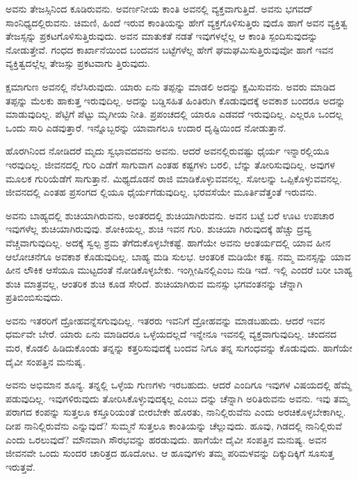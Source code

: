 ಅವನು ತೇಜಸ್ಸಿನಿಂದ ಕೂಡಿರುವನು. ಅವರ್ಣನೀಯ ಕಾಂತಿ ಅವನಲ್ಲಿ ವ್ಯಕ್ತವಾಗುತ್ತಿದೆ. ಅವನು ಭಗವದ್​ಸಾಂನಿಧ್ಯದಲ್ಲಿರುವನು. ಚಿಮಣಿ, ಹಿಂದೆ ಇರುವ ಕಾಂತಿಯನ್ನು ಹೇಗೆ ವ್ಯಕ್ತಗೊಳಿಸುತ್ತಿರು ವುದೊ ಹಾಗೆ ಅವನ ವ್ಯಕ್ತಿತ್ವ ತೇಜಸ್ಸನ್ನು ಪ್ರಕಟಗೊಳಿಸುತ್ತಿರುವುದು. ಅವನ ಮಾತುಕತೆ ನಡತೆ ಇವುಗಳಲ್ಲೆಲ್ಲ ಆ ಕಾಂತಿ ಸ್ಪಂದಿಸುವುದನ್ನು ನೋಡುತ್ತೇವೆ. ಗಂಧದ ಕಾರ್ಖಾನೆಯಿಂದ ಬಂದವನ ಬಟ್ಟೆಗಳೆಲ್ಲ ಹೇಗೆ ಘಮಘಮಿಸುತ್ತಿರುವುವೋ ಹಾಗೆ ಇವನ ವ್ಯಕ್ತಿತ್ವದಲ್ಲೆಲ್ಲ ತೇಜಸ್ಸು ಪ್ರಕಟವಾಗು ತ್ತಿರುವುದು.

ಕ್ಷಮಾಗುಣ ಅವನಲ್ಲಿ ನೆಲೆಸಿರುವುದು. ಯಾರು ಏನು ತಪ್ಪನ್ನು ಮಾಡಲಿ ಅದನ್ನು ಕ್ಷಮಿಸುವನು. ಅವರು ಮಾಡಿದ ತಪ್ಪನ್ನು ಮೆಲಕು ಹಾಕುತ್ತ ಇರುವುದಿಲ್ಲ. ಅದನ್ನು ಬಡ್ಡಿಸಹಿತ ಹಿಂತಿರುಗಿ ಕೊಡುವುದಕ್ಕೆ ಅವಕಾಶ ಬಂದರೂ ಅದನ್ನು ಮಾಡುವುದಿಲ್ಲ. ಪೆಟ್ಟಿಗೆ ಪೆಟ್ಟು ಮೃಗೀಯ ನೀತಿ. ಪ್ರಪಂಚದಲ್ಲಿ ಯಾರೂ ಎಡವದೆ ಇರುವುದಿಲ್ಲ. ಎಲ್ಲರೂ ಒಂದಲ್ಲ ಒಂದು ಸಾರಿ ಎಡವುತ್ತಾರೆ. ಇನ್ನೊಬ್ಬರನ್ನು ಯಾವಾಗಲೂ ಉದಾರ ದೃಷ್ಟಿಯಿಂದ ನೋಡುತ್ತಾನೆ.

ಹೊರಗಿನಿಂದ ನೋಡಿದರೆ ಮೃದು ಸ್ವಭಾವದವನು ಅವನು. ಆದರೆ ಅವನಲ್ಲಿರುವಷ್ಟು ಧೈರ್ಯ ಇನ್ನಾರಲ್ಲಿಯೂ ಇರವುದಿಲ್ಲ. ಜೀವನದಲ್ಲಿ ಗುರಿ ಎಡೆಗೆ ಸಾಗುವಾಗ ಎಂತಹ ಕಷ್ಟಗಳು ಬರಲಿ, ಬೆನ್ನು ತೋರಿಸುವುದಿಲ್ಲ. ಅವುಗಳ ಮೂಲಕ ಗುರಿಯೆಡೆಗೆ ಸಾಗುತ್ತಾನೆ. ಮಿಥ್ಯದೊಡನೆ ರಾಜಿ ಮಾಡಿಕೊಳ್ಳುವವನಲ್ಲ. ಸೋಲನ್ನು ಒಪ್ಪಿಕೊಳ್ಳುವವನಲ್ಲ. ಜೀವನದಲ್ಲಿ ಎಂತಹ ಪ್ರಸಂಗದ ಲ್ಲಿಯೂ ಧೈರ್ಯಗೆಡುವುದಿಲ್ಲ. ಭರವಸೆಯೇ ಮೂರ್ತಿವೆತ್ತಂತೆ ಇರುವನು.

ಅವನು ಬಾಹ್ಯದಲ್ಲಿ ಶುಚಿಯಾಗಿರುವನು, ಅಂತರದಲ್ಲಿ ಶುಚಿಯಾಗಿರುವನು. ಅವನ ಬಟ್ಟೆ ಬರೆ ಊಟ ಉಪಚಾರ ಇವುಗಳೆಲ್ಲ ಶುಚಿಯಾಗಿರುವುವು. ಶೋಕಿಯಲ್ಲ, ಶುಚಿ ಇವನ ಗುರಿ. ಶುಚಿಯಾ ಗಿರುವುದಕ್ಕೆ ಹೆಚ್ಚು ದ್ರವ್ಯ ವೆಚ್ಚವಾಗುವುದಿಲ್ಲ. ಅದಕ್ಕೆ ಸ್ವಲ್ಪ ಶ್ರಮ ತೆಗೆದುಕೊಳ್ಳಬೇಕಷ್ಟೆ. ಹಾಗೆಯೇ ಅವನು ಆಂತರ್ಯದಲ್ಲಿ ಯಾವ ಹೀನ ಆಲೋಚನೆಗೂ ಅವಕಾಶ ಕೊಡುವುದಿಲ್ಲ. ಬಾಹ್ಯ ಮಡಿ ಸುಲಭ. ಆಂತರಿಕ ಮಡಿಯೇ ಕಷ್ಟ. ನಮ್ಮ ಮನಸ್ಸನ್ನು ಯಾವ ಹೀನ ಲೌಕಿಕ ಆಸೆಯೂ ಮುಟ್ಟದಂತೆ ನೋಡಿಕೊಳ್ಳಬೇಕು. ಇಂಗ್ಲೀಷಿನಲ್ಲಿಎಂಬ ನುಡಿ ಇದೆ. ಇಲ್ಲಿ ಎಂದರೆ ಬರೀ ಬಾಹ್ಯ ಶುಚಿ ಮಾತ್ರವಲ್ಲ, ಆಂತರಿಕ ಶುಚಿ ಕೂಡ ಸೇರಿದೆ. ಶುಚಿಯಾಗಿರುವ ಮನಸ್ಸು ಭಗವಂತನನ್ನು ಚೆನ್ನಾಗಿ ಪ್ರತಿಬಿಂಬಿಸುವುದು.

ಅವನು ಇತರರಿಗೆ ದ್ರೋಹವನ್ನೆಸಗುವುದಿಲ್ಲ. ಇತರರು ಇವನಿಗೆ ದ್ರೋಹವನ್ನು ಮಾಡಬಹುದು. ಆದರೆ ಇವನ ಧರ್ಮವೇ ಬೇರೆ. ಯಾರು ಏನು ಮಾಡಿದರೂ ಒಳ್ಳೆಯದಲ್ಲದೆ ಇನ್ನೇನೂ ಇವನಲ್ಲಿ ವ್ಯಕ್ತವಾಗುವುದಿಲ್ಲ. ಚಂದನದ ಮರ, ಕೊಡಲಿ ಹಿಡಿದುಕೊಂಡು ತನ್ನನ್ನು ಕತ್ತರಿಸುವುದಕ್ಕೆ ಬಂದವ ನಿಗೂ ತನ್ನ ಸುಗಂಧವನ್ನು ಕೊಡುವುದು. ಹಾಗೆಯೇ ದೈವೀ ಸಂಪತ್ತಿನ ಮನುಷೃ.

ಅವನು ಅಭಿಮಾನ ಶೂನ್ಯ. ತನ್ನಲ್ಲಿ ಒಳ್ಳೆಯ ಗುಣಗಳು ಇರಬಹುದು. ಆದರೆ ಎಂದಿಗೂ ಇವುಗಳ ವಿಷಯದಲ್ಲಿ ಹೆಮ್ಮೆ ಪಡುವುದಿಲ್ಲ. ಇವುಗಳಿರುವುದು ತೋರಿಸಿಕೊಳ್ಳುವುದಕ್ಕಲ್ಲ ಎಂಬು ದನ್ನು ಚೆನ್ನಾಗಿ ಅರಿತಿರುವನು ಅವನು. ಇವು ತಮ್ಮ ಪರಾಗದ ಕಂಪನ್ನು ಸುತ್ತಲೂ ಕಸ್ತೂರಿಯಂತೆ ಬೀರಬೇಕೇ ಹೊರತು, ನಾನಿಲ್ಲಿರುವೆನು ಎಂದು ಅರಚಿಕೊಳ್ಳಬೇಕಾಗಿಲ್ಲ. ದೀಪ ನಾನಿಲ್ಲಿರುವೆನು ಎನ್ನುವುದೆ? ಸುಮ್ಮನೆ ಸುತ್ತಲೂ ಕಾಂತಿಯನ್ನು ಚೆಲ್ಲುವುದು. ಹೂವು, ಗಿಡದಲ್ಲಿ ನಾನಿಲ್ಲಿರುವೆ ಎಂದು ಒರಲುವುದೆ? ಮೌನವಾಗಿ ಸೌರಭವನ್ನು ಹರಡುವುದು. ಹಾಗೆಯೇ ದೈವೀ ಸಂಪತ್ತಿನ ಮನುಷ್ಯ. ಅವನ ಜೀವನವೇ ಒಂದು ಸುಂದರ ಚಾರಿತ್ರದ ಹೂದೋಟ. ಆ ಹೂವುಗಳು ತಮ್ಮ ಪರಿಮಳವನ್ನು ದಿಕ್ಕುದಿಕ್ಕಿಗೆ ಸೂಸುತ್ತ ಇರುತ್ತವೆ.

